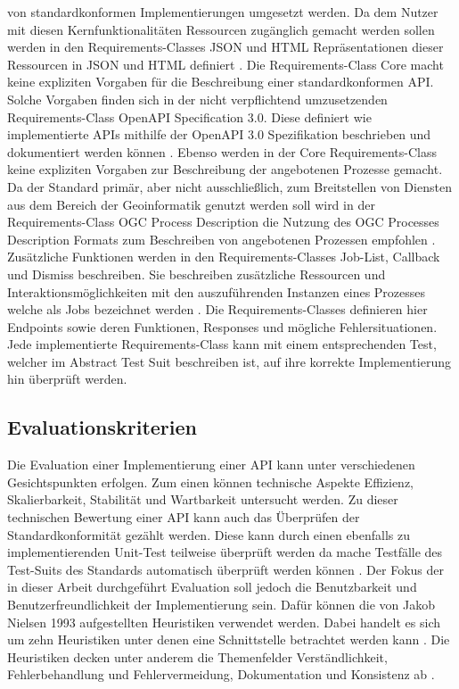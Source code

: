 von standardkonformen Implementierungen umgesetzt werden. Da dem Nutzer mit diesen Kernfunktionalitäten Ressourcen zugänglich gemacht werden sollen werden in den 
Requirements-Classes JSON und HTML Repräsentationen dieser Ressourcen in JSON und HTML definiert \cite{ogc_api_processes_core}. Die Requirements-Class Core macht keine
expliziten Vorgaben für die Beschreibung einer standardkonformen API. Solche Vorgaben finden sich in der nicht verpflichtend umzusetzenden Requirements-Class
OpenAPI Specification 3.0. Diese definiert wie implementierte APIs mithilfe der OpenAPI 3.0 Spezifikation beschrieben und dokumentiert werden können \cite{ogc_api_processes_core}.
Ebenso werden in der Core Requirements-Class keine expliziten Vorgaben zur Beschreibung der angebotenen Prozesse gemacht. Da der Standard primär, aber nicht
ausschließlich, zum Breitstellen von Diensten aus dem Bereich der Geoinformatik genutzt werden soll wird in der Requirements-Class OGC Process Description die Nutzung des 
OGC Processes Description Formats zum Beschreiben von angebotenen Prozessen empfohlen \cite{ogc_api_processes_core}. 
Zusätzliche Funktionen werden in den Requirements-Classes Job-List, Callback und Dismiss beschreiben. Sie beschreiben zusätzliche Ressourcen und Interaktionsmöglichkeiten 
mit den auszuführenden Instanzen eines Prozesses welche als Jobs bezeichnet werden \cite{ogc_api_processes_core}.
Die Requirements-Classes definieren hier Endpoints sowie deren Funktionen, Responses und mögliche Fehlersituationen. Jede implementierte Requirements-Class kann mit einem 
entsprechenden Test, welcher im Abstract Test Suit beschreiben ist, auf ihre korrekte Implementierung hin überprüft werden. 
\subsection{Evaluationskriterien}
Die Evaluation einer Implementierung einer API kann unter verschiedenen Gesichtspunkten erfolgen. Zum einen können technische Aspekte Effizienz, Skalierbarkeit,
Stabilität und Wartbarkeit untersucht werden. Zu dieser technischen Bewertung einer API kann auch das Überprüfen der Standardkonformität gezählt werden.
Diese kann durch einen ebenfalls zu implementierenden Unit-Test teilweise überprüft werden da mache Testfälle des Test-Suits des Standards automatisch überprüft
werden können \cite{ogc_api_processes_core}. Der Fokus der in dieser Arbeit durchgeführt Evaluation soll jedoch die Benutzbarkeit und Benutzerfreundlichkeit der 
Implementierung sein. Dafür können die von Jakob Nielsen 1993 aufgestellten Heuristiken verwendet werden. Dabei handelt es sich um zehn Heuristiken unter denen 
eine Schnittstelle betrachtet werden kann \cite{usability_engineering}. Die Heuristiken decken unter anderem die Themenfelder Verständlichkeit, Fehlerbehandlung und 
Fehlervermeidung, Dokumentation und Konsistenz ab \cite{usability_engineering}. 




